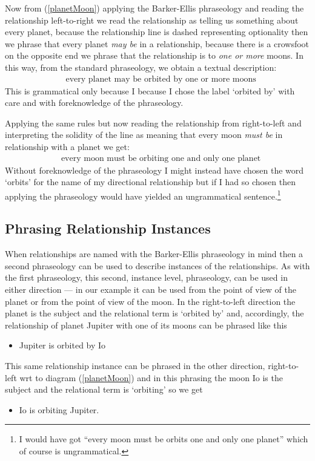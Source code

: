 Now from (\ref{planetMoon}) applying the Barker-Ellis  phraseology and reading the 
relationship left-to-right we read the relationship as telling us something about every planet, because the relationship line is dashed representing optionality then we phrase that every planet \textit{may be} 
in a relationship,
because there is a crowsfoot on the opposite end we phrase that the relationship is to 
\textit{one or more} moons.  In this way, from the standard phraseology, we obtain a textual description:
\begin{align}
&\mbox{every planet may be orbited by one or more moons} 
\end{align}
This is grammatical only because I 
because I chose the label `orbited by' with care and with foreknowledge of the  phraseology.
 
Applying the same rules but now reading  the relationship from right-to-left and interpreting the solidity of the line as 
 meaning that every moon \textit{must be} in relationship with a planet we get:
\begin{align}
&\mbox{every moon must be orbiting  one and only one planet} 
\end{align}
Without foreknowledge of the phraseology I might instead have chosen the word `orbits' for the name of my directional relationship but if I had so chosen then applying the phraseology would have yielded an ungrammatical sentence.\footnote{I would have got ``every moon must be orbits one and only one planet'' which of course is ungrammatical.}
\subsection{Phrasing Relationship Instances}
\mynote
When relationships are named with the 
Barker-Ellis phraseology in mind  then a second phraseology can be used to describe instances of the relationships. 
As with the first phraseology, this second, instance level, phraseology,
 can be used in either direction
 --- in our example it can be used from the point of view
of the planet or from the point of view of the moon.
In the right-to-left direction the planet is the subject and the relational term is
`orbited by' and, accordingly, the relationship of planet Jupiter with one of its moons can be phrased like this
\begin{itemize}
\renewcommand\labelitemi{--}
\item Jupiter is orbited by Io
\end{itemize}

This same relationship instance can be phrased in the other direction, right-to-left wrt to diagram (\ref{planetMoon}) and in this phrasing the moon Io is the subject and the relational term is `orbiting' so we get
\begin{itemize}
\renewcommand\labelitemi{--}
\item Io is orbiting  Jupiter.
\end{itemize}

